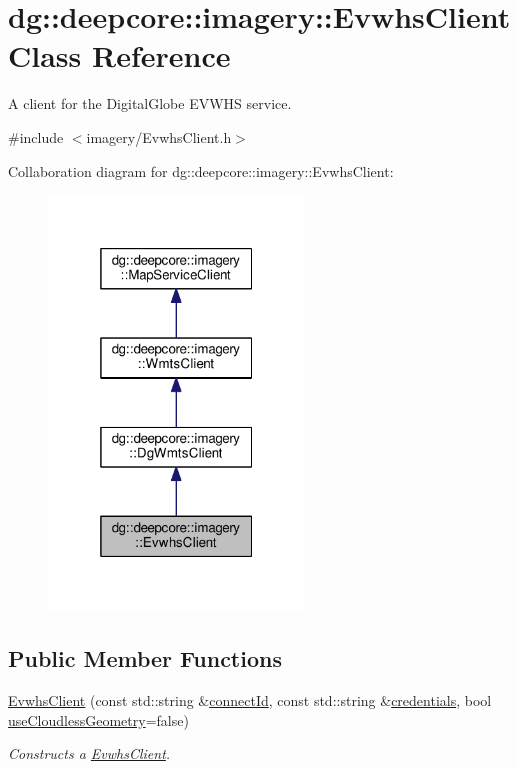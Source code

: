 \hypertarget{structdg_1_1deepcore_1_1imagery_1_1_evwhs_client}{}\section{dg\+:\+:deepcore\+:\+:imagery\+:\+:Evwhs\+Client Class Reference}
\label{structdg_1_1deepcore_1_1imagery_1_1_evwhs_client}


A client for the Digital\+Globe E\+V\+W\+HS service.  




{\ttfamily \#include $<$imagery/\+Evwhs\+Client.\+h$>$}



Collaboration diagram for dg\+:\+:deepcore\+:\+:imagery\+:\+:Evwhs\+Client\+:
\nopagebreak
\begin{figure}[H]
\begin{center}
\leavevmode
\includegraphics[width=193pt]{structdg_1_1deepcore_1_1imagery_1_1_evwhs_client__coll__graph}
\end{center}
\end{figure}
\subsection*{Public Member Functions}
\begin{DoxyCompactItemize}
\item 
\hyperlink{structdg_1_1deepcore_1_1imagery_1_1_evwhs_client_ae53f96269150d17884ac00a1c47ead03}{Evwhs\+Client} (const std\+::string \&\hyperlink{classdg_1_1deepcore_1_1imagery_1_1_dg_wmts_client_aaa23928355c68c5422a5aab297d64f99}{connect\+Id}, const std\+::string \&\hyperlink{group___imagery_module_gac4c03ea635c336ca2fe7de533706c11c}{credentials}, bool \hyperlink{classdg_1_1deepcore_1_1imagery_1_1_dg_wmts_client_a718ef987832eb1d5bbab510c6ef7b70c}{use\+Cloudless\+Geometry}=false)
\begin{DoxyCompactList}\small\item\em Constructs a \hyperlink{structdg_1_1deepcore_1_1imagery_1_1_evwhs_client}{Evwhs\+Client}. \end{DoxyCompactList}\end{DoxyCompactItemize}
